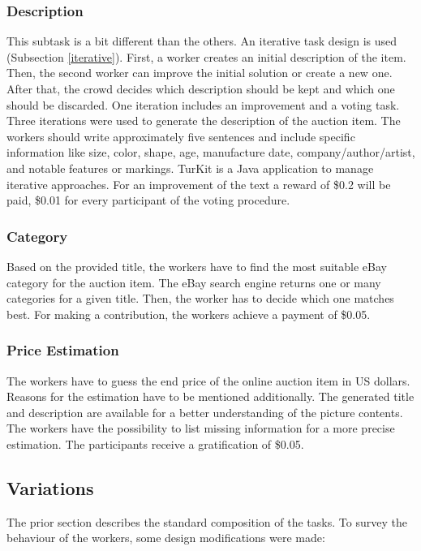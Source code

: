 \subsubsection{Description}
This subtask is a bit different than the others. An iterative task design is used (Subsection \ref{iterative}). First, a worker creates an initial description of the item. Then, the second worker can improve the initial solution or create a new one. After that, the crowd decides which description should be kept and which one should be discarded. One iteration includes an improvement and a voting task. Three iterations were used to generate the description of the auction item. The workers should write approximately five sentences and include specific information like size, color, shape, age, manufacture date, company/author/artist, and notable features or markings. TurKit is a Java application to manage iterative approaches. For an improvement of the text a reward of \$0.2 will be paid, \$0.01 for every participant of the voting procedure.
\subsubsection{Category}
Based on the provided title, the workers have to find the most suitable eBay category for the auction item. The eBay search engine returns one or many categories for a given title. Then, the worker has to decide which one matches best. For making a contribution, the workers achieve a payment of \$0.05.
\subsubsection{Price Estimation}
The workers have to guess the end price of the online auction item in US dollars. Reasons for the estimation have to be mentioned additionally. The generated title and description are available for a better understanding of the picture contents. The workers have the possibility to list missing information for a more precise estimation. The participants receive a gratification of \$0.05.

\subsection{Variations}
The prior section describes the standard composition of the tasks. To survey the behaviour of the workers, some design modifications were made: 
